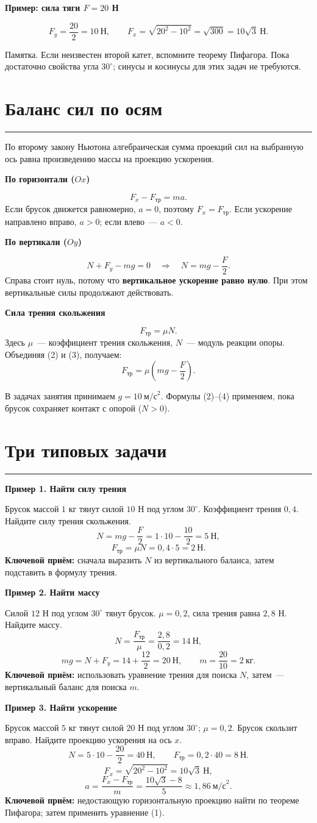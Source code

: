 \documentclass[a4paper,12pt]{article}
\newcommand{\ruleline}{\par\vspace{2pt}\noindent\textcolor{accent}{\rule{\linewidth}{0.55pt}}\par\vspace{1pt}}
\newcommand{\secname}[1]{\section{#1}\ruleline}
\newcommand{\subname}[1]{\vspace{0.3em}\textcolor{darkaccent}{\bfseries #1}\par\vspace{-0.2em}}
\begin{document}
\subname{Пример: сила тяги $F=20$ Н}
\[
F_y=\frac{20}{2}=10\ \text{Н},\qquad
F_x=\sqrt{20^2-10^2}=\sqrt{300}=10\sqrt3\ \text{Н}.
\]

\textcolor{darkaccent}{Памятка.} Если неизвестен второй катет, вспомните теорему Пифагора. Пока достаточно свойства угла $30^\circ$; синусы и косинусы для этих задач не требуются.

\secname{Баланс сил по осям}

По второму закону Ньютона алгебраическая сумма проекций сил на выбранную ось равна произведению массы на проекцию ускорения.

\subname{По горизонтали ($Ox$)}
\[
\boxed{F_x-F_{\text{тр}}=ma.}\tag{1}
\]
Если брусок движется равномерно, $a=0$, поэтому $F_x=F_{\text{тр}}$. Если ускорение направлено вправо, $a>0$; если влево~--- $a<0$.

\subname{По вертикали ($Oy$)}
\[
N+F_y-mg=0
\quad\Longrightarrow\quad
\boxed{N=mg-\frac F2}.\tag{2}
\]
Справа стоит нуль, потому что \textbf{вертикальное ускорение равно нулю}. При этом вертикальные силы продолжают действовать.

\subname{Сила трения скольжения}
\[
\boxed{F_{\text{тр}}=\mu N.}\tag{3}
\]
Здесь $\mu$~--- коэффициент трения скольжения, $N$~--- модуль реакции опоры. Объединяя (2) и (3), получаем:
\[
\boxed{F_{\text{тр}}=\mu\left(mg-\frac F2\right)}.\tag{4}
\]

В задачах занятия принимаем $g=10\ \text{м/с}^2$. Формулы (2)--(4) применяем, пока брусок сохраняет контакт с опорой ($N>0$).

\secname{Три типовых задачи}

\subname{Пример 1. Найти силу трения}
Брусок массой $1$ кг тянут силой $10$ Н под углом $30^\circ$. Коэффициент трения $0{,}4$. Найдите силу трения скольжения.
\[
N=mg-\frac F2=1\cdot10-\frac{10}{2}=5\ \text{Н},
\]
\[
F_{\text{тр}}=\mu N=0{,}4\cdot5=\boxed{2\ \text{Н}}.
\]
\textbf{Ключевой приём:} сначала выразить $N$ из вертикального баланса, затем подставить в формулу трения.

\subname{Пример 2. Найти массу}
Силой $12$ Н под углом $30^\circ$ тянут брусок. $\mu=0{,}2$, сила трения равна $2{,}8$ Н. Найдите массу.
\[
N=\frac{F_{\text{тр}}}{\mu}=\frac{2{,}8}{0{,}2}=14\ \text{Н},
\]
\[
mg=N+F_y=14+\frac{12}{2}=20\ \text{Н},\qquad
m=\frac{20}{10}=\boxed{2\ \text{кг}}.
\]
\textbf{Ключевой приём:} использовать уравнение трения для поиска $N$, затем~--- вертикальный баланс для поиска $m$.

\subname{Пример 3. Найти ускорение}
Брусок массой $5$ кг тянут силой $20$ Н под углом $30^\circ$; $\mu=0{,}2$. Брусок скользит вправо. Найдите проекцию ускорения на ось $x$.
\[
N=5\cdot10-\frac{20}{2}=40\ \text{Н},\qquad
F_{\text{тр}}=0{,}2\cdot40=8\ \text{Н}.
\]
\[
F_x=\sqrt{20^2-10^2}=10\sqrt3\ \text{Н},
\]
\[
a=\frac{F_x-F_{\text{тр}}}{m}
=\frac{10\sqrt3-8}{5}
\approx\boxed{1{,}86\ \text{м/с}^2}.
\]
\textbf{Ключевой приём:} недостающую горизонтальную проекцию найти по теореме Пифагора; затем применить уравнение (1).
\end{document}
